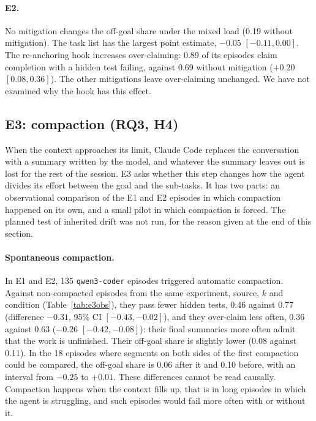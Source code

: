 \paragraph{E2.} No mitigation changes the off-goal share under the mixed load (0.19 without
mitigation). The task list has the largest point estimate, $-0.05$ $[-0.11, 0.00]$. The re-anchoring
hook increases over-claiming: 0.89 of its episodes claim completion with a hidden test failing,
against 0.69 without mitigation ($+0.20$ $[0.08, 0.36]$). The other mitigations leave over-claiming
unchanged. We have not examined why the hook has this effect.

\subsection{E3: compaction (RQ3, H4)}
\label{sec:e3}

When the context approaches its limit, Claude Code replaces the conversation with a summary written
by the model, and whatever the summary leaves out is lost for the rest of the session. E3 asks
whether this step changes how the agent divides its effort between the goal and the sub-tasks. It
has two parts: an observational comparison of the E1 and E2 episodes in which compaction happened
on its own, and a small pilot in which compaction is forced. The planned test of inherited drift was
not run, for the reason given at the end of this section.

\begin{table}[t]
  \centering
  \caption{E3, observational: \texttt{qwen3-coder} episodes of E1 and E2 with automatic compaction
  against episodes without it. Control episodes are re-weighted to the compacted episodes' mix of
  experiment, source, $k$ and condition. The last row compares segments after and before the first
  compaction within the same episodes, excluding the segment in which it occurred. Intervals are
  95\% task-cluster bootstrap intervals. The comparison is correlational.}
  \label{tab:e3obs}
  \small
  \fittable{}
\end{table}

\paragraph{Spontaneous compaction.} In E1 and E2, 135 \texttt{qwen3-coder} episodes triggered
automatic compaction. Against non-compacted episodes from the same experiment, source, $k$ and
condition (Table~\ref{tab:e3obs}), they pass fewer hidden tests, 0.46 against 0.77 (difference
$-0.31$, 95\% CI $[-0.43, -0.02]$), and they over-claim less often, 0.36 against 0.63 ($-0.26$
$[-0.42, -0.08]$): their final summaries more often admit that the work is unfinished. Their
off-goal share is slightly lower (0.08 against 0.11). In the 18 episodes where segments on both
sides of the first compaction could be compared, the off-goal share is 0.06 after it and 0.10
before, with an interval from $-0.25$ to $+0.01$. These differences cannot be read causally.
Compaction happens when the context fills up, that is in long episodes in which the agent is
struggling, and such episodes would fail more often with or without it.

